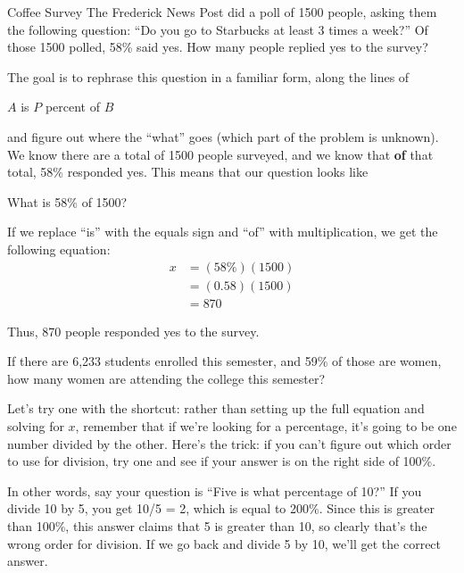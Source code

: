 \begin{example}[https://www.youtube.com/watch?v=8VSRt2PMqJI&list=PLfmpjsIzhztsZtnb7HnXrQ8SLoiOCIcAM&index=4]{Coffee Survey}
The Frederick News Post did a poll of 1500 people, asking them the following question: ``Do you go to Starbucks at least 3 times a week?'' Of those 1500 polled, 58\% said yes.  How many people replied yes to the survey?

\sol
The goal is to rephrase this question in a familiar form, along the lines of 
\begin{center}
$A$ is $P$ percent of $B$
\end{center}
and figure out where the ``what'' goes (which part of the problem is unknown).\\

We know there are a total of 1500 people surveyed, and we know that \textbf{of} that total, 58\% responded yes.  This means that our question looks like
\begin{center}
What is 58\% of 1500?
\end{center}

If we replace ``is'' with the equals sign and ``of'' with multiplication, we get the following equation:
\begin{align*}
x &= (58\%)(1500)\\
&= (0.58)(1500)\\
&= \boxed{870}
\end{align*}

Thus, 870 people responded yes to the survey.
\end{example}

\begin{try}
If there are 6,233 students enrolled this semester, and 59\% of those are women, how many women are attending the college this semester?
\end{try}

Let's try one with the shortcut: rather than setting up the full equation and solving for $x$, remember that if we're looking for a percentage, it's going to be one number divided by the other.  Here's the trick: if you can't figure out which order to use for division, try one and see if your answer is on the right side of 100\%.

In other words, say your question is ``Five is what percentage of 10?''  If you divide 10 by 5, you get 10/5 = 2, which is equal to 200\%.  Since this is greater than 100\%, this answer claims that 5 is greater than 10, so clearly that's the wrong order for division.  If we go back and divide 5 by 10, we'll get the correct answer.

